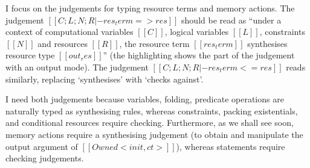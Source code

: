 \documentclass[11pt]{article}%
\begin{document}
I focus on the judgements for typing resource terms and memory actions. The
judgement $[[ C ; L ; N ; R |- res_term => res ]]$ should be read as ``under a
context of computational variables $[[ C ]]$, logical variables $[[ L ]]$,
constraints $[[ N ]]$ and resources $[[ R ]]$, the resource term
$[[ res_term ]]$ synthesises resource type $[[ out_res ]]$'' (the highlighting shows the
part of the judgement with an \colorbox{red!10}{output mode}). The judgement
$[[ C ; L ; N ; R |- res_term <= res ]]$ reads similarly, replacing
`synthesises' with `checks against'.

I need both judgements because variables, folding, predicate operations are
naturally typed as synthesising rules, whereas constraints, packing
existentials, and conditional resources require checking.  Furthermore, as we
shall see soon, memory actions require a synthesising judgement (to obtain and
manipulate the output argument of $[[ Owned < init , ct > ]]$), whereas
statements require checking judgements.

\begin{figure}[t]
\small
\centering
\begingroup
\NewCommandCopy{\origcndrule}{\cndrule}
\renewcommand{\cndrule}[4][]{\origcndrule[#1]{#2}{%
\begin{minipage}{0.8\textwidth}
    \raggedright%
    \leftskip2em
    \parindent-2em
    $#3$
\end{minipage}
}{#4}}%
\begin{minipage}{.4\textwidth}
\vspace{-2\baselineskip}
\cndruleResXXChkXXIfXXTrue{}%
\\[-1\baselineskip]
\\[-1\baselineskip]
\vspace{-2\baselineskip}
\end{minipage}
\begin{minipage}{.5\textwidth}
\vspace{-2\baselineskip}
\\[-1\baselineskip]
\\[-1\baselineskip]
\vspace{-2\baselineskip}
\end{minipage}
\endgroup
\end{figure}
\end{document}
